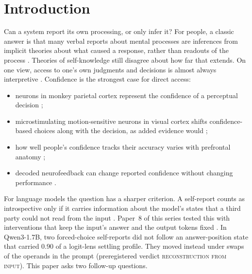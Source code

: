 \documentclass[11pt]{article}
\newcommand{\verdict}[1]{\textsc{\MakeLowercase{#1}}}
\begin{document}
\begin{abstract}
In this model, positions after the answer follow the confidence implied by the recipient's own input. The design cannot tell whether they recompute it from the question or read it from the lower, unswapped layers of the answer positions. Confidence is often taken to be the best case for direct access in humans, so the absence of a linearly readable route here is notable.
\end{abstract}

\section{Introduction}

Can a system report its own processing, or only infer it? For people, a classic answer is that many verbal reports about mental processes are inferences from implicit theories about what caused a response, rather than readouts of the process \citep{nisbett1977telling}. Theories of self-knowledge still disagree about how far that extends. On one view, access to one's own judgments and decisions is almost always interpretive \citep{carruthers2011opacity}. Confidence is the strongest case for direct access:
\begin{itemize}
\item neurons in monkey parietal cortex represent the confidence of a perceptual decision \citep{kiani2009representation};
\item microstimulating motion-sensitive neurons in visual cortex shifts confidence-based choices along with the decision, as added evidence would \citep{fetsch2014effects};
\item how well people's confidence tracks their accuracy varies with prefrontal anatomy \citep{fleming2010relating};
\item decoded neurofeedback can change reported confidence without changing performance \citep{cortese2016multivoxel}.
\end{itemize}

For language models the question has a sharper criterion. A self-report counts as introspective only if it carries information about the model's states that a third party could not read from the input \citep{song2025privileged,singh2026reality}. Paper~8 of this series tested this with interventions that keep the input's answer and the output tokens fixed \citep{ramdan2026settling}. In Qwen3-1.7B, two forced-choice self-reports did not follow an answer-position state that carried 0.90 of a logit-lens settling profile. They moved instead under swaps of the operands in the prompt (preregistered verdict \verdict{RECONSTRUCTION FROM INPUT}). This paper asks two follow-up questions.
\end{document}
